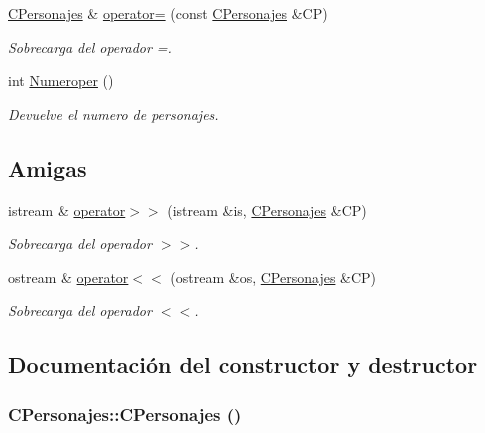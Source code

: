 \begin{CompactItemize}
\hyperlink{class_c_personajes}{CPersonajes} \& \hyperlink{class_c_personajes_76356e18c65e246be804711ad481e2e4}{operator=} (const \hyperlink{class_c_personajes}{CPersonajes} \&CP)
\begin{CompactList}\small\item\em Sobrecarga del operador =. \item\end{CompactList}\item 
int \hyperlink{class_c_personajes_90a3e2265d8b8800ccb322bdb8927566}{Numeroper} ()
\begin{CompactList}\small\item\em Devuelve el numero de personajes. \item\end{CompactList}\end{CompactItemize}
\subsection*{Amigas}
\begin{CompactItemize}
\item 
istream \& \hyperlink{class_c_personajes_4456215e5677663ee76f95b40e2ae502}{operator$>$$>$} (istream \&is, \hyperlink{class_c_personajes}{CPersonajes} \&CP)
\begin{CompactList}\small\item\em Sobrecarga del operador $>$$>$. \item\end{CompactList}\item 
ostream \& \hyperlink{class_c_personajes_bdc717e962d38d0b04d8fc86b0fd0afc}{operator$<$$<$} (ostream \&os, \hyperlink{class_c_personajes}{CPersonajes} \&CP)
\begin{CompactList}\small\item\em Sobrecarga del operador $<$$<$. \item\end{CompactList}\end{CompactItemize}


\subsection{Documentación del constructor y destructor}
\hypertarget{class_c_personajes_fc9f1e237eb306984f85393ff4e65842}{
\subsubsection[{CPersonajes}]{\setlength{\rightskip}{0pt plus 5cm}CPersonajes::CPersonajes ()}}
\label{class_c_personajes_fc9f1e237eb306984f85393ff4e65842}


